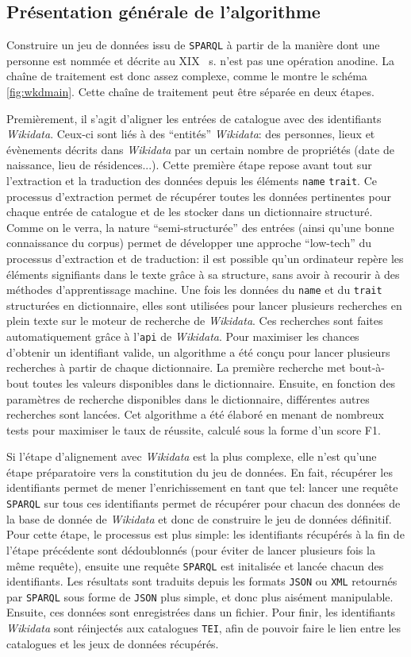\documentclass[a4paper, 12pt, twoside]{book}
\newcommand{\scl}[1]{%
	#1%
	\ifthenelse{\equal{#1}{I}}{\up{er}}{\up{ème}}%
	~s.%
}
\newcommand{\api}{\texttt{\gls{api}}}
\newcommand{\json}{\texttt{JSON}}
\newcommand{\sparql}{\texttt{\gls{SPARQL}}}
\newcommand{\tei}{\texttt{TEI}}
\newcommand{\tname}{\texttt{name}}
\newcommand{\ttrait}{\texttt{trait}}
\newcommand{\xml}{\texttt{XML}}
\newcommand{\wkd}{\textit{Wikidata}}
\begin{document}
\subsection{Présentation générale de l'algorithme}
Construire un jeu de données issu de \sparql{} à partir de la manière dont une personne est nommée et décrite au \scl{XIX} n'est pas une opération anodine. La chaîne de traitement est donc assez complexe, comme le montre le schéma \ref{fig:wkdmain}. Cette chaîne de traitement peut être séparée en deux étapes.

Premièrement, il s'agit d'aligner les entrées de catalogue avec des identifiants \wkd{}. Ceux-ci sont liés à des \enquote{entités} \wkd{}: des personnes, lieux et évènements décrits dans \wkd{} par un certain nombre de propriétés (date de naissance, lieu de résidences...). Cette première étape repose avant tout sur l'extraction et la traduction des données depuis les éléments \tname{} \ttrait{}. Ce processus d'extraction permet de récupérer toutes les données pertinentes pour chaque entrée de catalogue et de les stocker dans un \gls{dictionnaire} structuré. Comme on le verra, la nature \enquote{semi-structurée} des entrées (ainsi qu'une bonne connaissance du corpus) permet de développer une approche \enquote{low-tech} du processus d'extraction et de traduction: il est possible qu'un ordinateur repère les éléments signifiants dans le texte grâce à sa structure, sans avoir à recourir à des méthodes d'apprentissage machine. Une fois les données du \tname{} et du \ttrait{} structurées en dictionnaire, elles sont utilisées pour lancer plusieurs recherches en plein texte sur le moteur de recherche de \wkd{}. Ces recherches sont faites automatiquement grâce à l'\api{} de \wkd{}. Pour maximiser les chances d'obtenir un identifiant valide, un algorithme a été conçu pour lancer plusieurs recherches à partir de chaque dictionnaire. La première recherche met bout-à-bout toutes les valeurs disponibles dans le dictionnaire. Ensuite, en fonction des paramètres de recherche disponibles dans le dictionnaire, différentes autres recherches sont lancées. Cet algorithme a été élaboré en menant de nombreux tests pour maximiser le taux de réussite, calculé sous la forme d'un \gls{score F1}.

Si l'étape d'alignement avec \wkd{} est la plus complexe, elle n'est qu'une étape préparatoire vers la constitution du jeu de données. En fait, récupérer les identifiants permet de mener l'enrichissement en tant que tel: lancer une requête \sparql{} sur tous ces identifiants permet de récupérer pour chacun des données de la base de donnée de \wkd{} et donc de construire le jeu de données définitif. Pour cette étape, le processus est plus simple: les identifiants récupérés à la fin de l'étape précédente sont dédoublonnés (pour éviter de lancer plusieurs fois la même requête), ensuite une requête \sparql{} est initalisée et lancée chacun des identifiants. Les résultats sont traduits depuis les formats \json{} ou \xml{} retournés par \sparql{} sous forme de \json{} plus simple, et donc plus aisément manipulable. Ensuite, ces données sont enregistrées dans un fichier. Pour finir, les identifiants \wkd{} sont réinjectés aux catalogues \tei{}, afin de pouvoir faire le lien entre les catalogues et les jeux de données récupérés.
\end{document}
